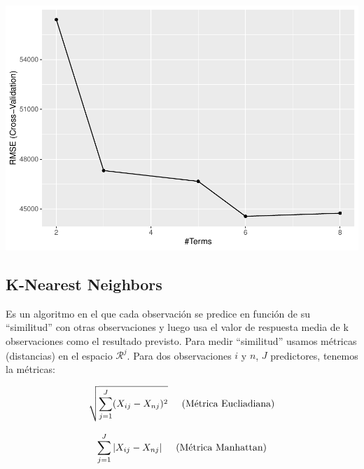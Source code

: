 \documentclass[
]{article}
\newenvironment{Shaded}{\begin{snugshade}}{\end{snugshade}}
\newcommand{\AttributeTok}[1]{\textcolor[rgb]{0.77,0.63,0.00}{#1}}
\newcommand{\CommentTok}[1]{\textcolor[rgb]{0.56,0.35,0.01}{\textit{#1}}}
\newcommand{\FunctionTok}[1]{\textcolor[rgb]{0.00,0.00,0.00}{#1}}
\newcommand{\NormalTok}[1]{#1}
\newcommand{\OtherTok}[1]{\textcolor[rgb]{0.56,0.35,0.01}{#1}}
\newcommand{\SpecialCharTok}[1]{\textcolor[rgb]{0.00,0.00,0.00}{#1}}
\begin{document}
\includegraphics{LAB02_files/figure-latex/unnamed-chunk-4-1.pdf}

\begin{Shaded}
\end{Shaded}

\hypertarget{k-nearest-neighbors}{%
\subsection{K-Nearest Neighbors}\label{k-nearest-neighbors}}

Es un algoritmo en el que cada observación se predice en función de su
``similitud'' con otras observaciones y luego usa el valor de respuesta
media de k observaciones como el resultado previsto. Para medir
``similitud'' usamos métricas (distancias) en el espacio
\(\mathcal{R}^j\). Para dos observaciones \(i\) y \(n\), \(J\)
predictores, tenemos la métricas:

\[\sqrt{\sum_{j=1}^J (X_{ij}-X_{nj})^2} \hspace{.5 cm} \text{(Métrica Eucliadiana)}\]

\[\sum_{j=1}^J |X_{ij}-X_{nj}| \hspace{.5 cm} \text{(Métrica Manhattan)}\]
\end{document}
